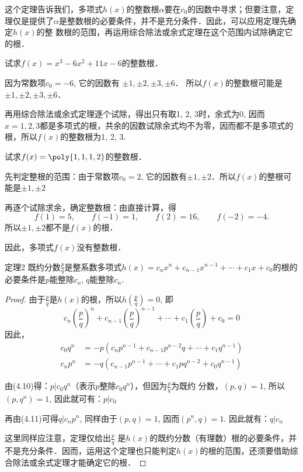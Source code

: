 这个定理告诉我们，多项式$h(x)$的整数根$\alpha$要在$c_0$的因数中寻求；但要注意，定理仅是提供了$\alpha$是整数根的必要条件，并不是充分条件．因此，可以应用定理先确定$h(x)$的整
数根的范围，再运用综合除法或余式定理在这个范围内试除确定它的根．

\begin{example}
    试求$f(x)=x^3-6x^2+11x-6$的整数根．
\end{example}

\begin{solution}
    因为常数项$c_0=-6$, 它的因数有
$\pm 1, \pm 2, \pm 3, \pm 6$．
所以$f(x)$的整数根可能是$\pm 1, \pm 2,\pm 3,\pm 6$．

再用综合除法或余式定理逐个试除，得出只有取1, 2, 3时，余式为0, 因而$x=1, 2, 3$都是多项式的根，共余的因数试除余式均不为零，因而都不是多项式的根，所以$f(x)$的整数根为1, 2, 3.
\end{solution}

\begin{example}
    试求$f(x)=\poly{1,1,1,2}$的整数根．
\end{example}

\begin{solution}
    先判定整根的范围：由于常数项$c_0=2$, 它的因数有$\pm 1,\pm 2$．所以$f(x)$的整根可能是$\pm 1,\pm 2$
    
    再逐个试除求余，确定整数根：由直接计算，得
\[f (1) =5,\qquad f (-1) =1,\qquad f (2) =16,\qquad f (-2) =-4.\]
所以$\pm 1,\pm 2$都不是$f(x)$的根．

因此，多项式$f(x)$没有整数根．
\end{solution}

\begin{blk}{定理2}
    既约分数$\frac{p}{q}$是整系数多项式$h (x) =c_nx^n+c_{n-1}x^{n-1}+\cdots+c_1x+c_0$的根的必要条件是$p$能整除$c_o$, $q$能整除$c_n$.
\end{blk}

\begin{proof}
    由于$\frac{p}{q}$是$h(x)$的根，所以$h\left(\frac{p}{q}\right)=0$, 即
\[c_n\left(\frac{p}{q}\right)^{n}+c_{n-1}\left(\frac{p}{q}\right)^{n-1}+\cdots +c_1\left(\frac{p}{q}\right)+c_0=0\]
因此，
\begin{align}
c_0q^n&= -p\left(c_np^{n-1}+c_{n-1}p^{n-2}q+\cdots+c_1q^{n-1}\right)\\
c_np^n&= -q\left(c_{n-1}p^{n-1}+\cdots+c_{1}pq^{n-2}+c_0q^{n-1}\right)   
\end{align}

由(4.10)得：$p|c_0q^n$（表示$p$整除$c_0q^n$），但因为$\frac{p}{q}$为既约
分数，$(p,q)=1$, 所以$(p,q^n)=1$, 因此就可有：$p|c_0$

再由(4.11)可得$q|c_np^n$, 同样由于$(p,q)=1$, 因而$(p^n,q)=1$. 因此就有：$q|c_n$

这里同样应注意，定理仅给出$\frac{p}{q}$
是$h(x)$的既约分数（有理数）根的必要条件，并不是充分条件．因而，运用这个定理也只能判定$h(x)$的根的范围，还须要借助综合除法或余式定理才能确定它的根．
\end{proof}


